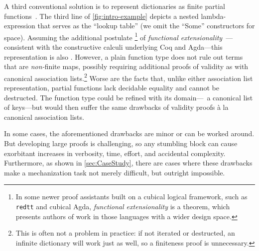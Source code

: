 A third conventional solution is to represent dictionaries as finite partial functions~\cite[Maps]{Pierce:SF1}.
%
The third line of \autoref{fig:intro-example} depicts a nested lambda-expression that serves as the ``lookup table'' (we omit the ``Some'' constructors for space).
%
%
Assuming the additional postulate%
\footnote{\hspace{0.01in}%
In some newer proof assistants built on a cubical logical framework, such as \texttt{redtt} and
cubical Agda, \emph{functional extensionality} is a theorem, which presents
authors of work in those languages with a wider design space.
}
of \emph{functional extensionality}~\mbox{\cite[Logic]{Pierce:SF1}}---consistent with the constructive calculi underlying Coq and Agda---this representation is also \emph{\extensional}.
%
However, a plain function type does not rule out terms that are \emph{non-}finite maps, possibly requiring additional proofs of validity as with canonical association lists.\footnote{\hspace{0.01in}%
%
This is often not a problem in practice:
%
if not iterated or destructed, an infinite dictionary will work just as well,
%
so a finiteness proof is unnecessary.
%
}
%
Worse are the facts that, unlike either association list representation, partial functions lack decidable equality and cannot be destructed.
%
The function type could be refined with its domain---\ie{}~a canonical list of keys---but would then suffer the same drawbacks of validity proofs \`{a} la canonical association lists.

In some cases, the aforementioned drawbacks are minor or can be worked around.
%
But developing large proofs is challenging, so any stumbling block can cause exorbitant increases in verbosity, time, effort, and accidental complexity.
%
Furthermore, as shown in \autoref{sec:CaseStudy}, there are cases where these drawbacks make a mechanization task not merely difficult, but outright impossible.



